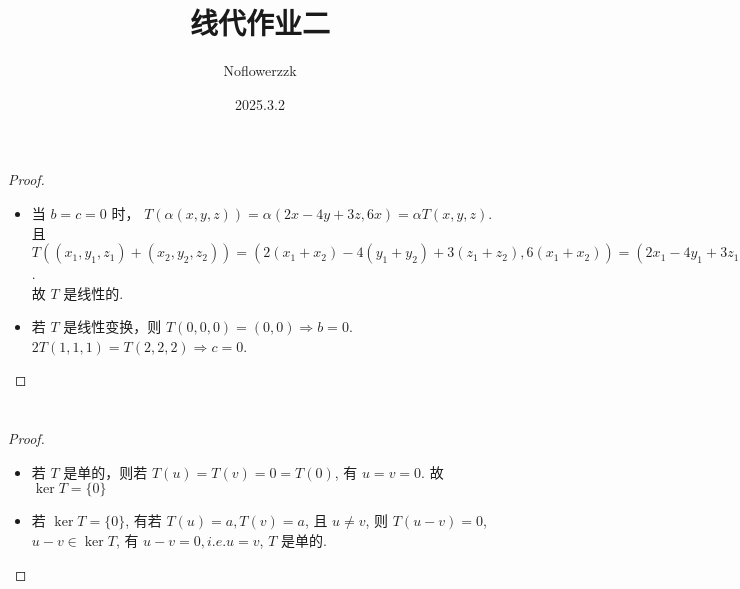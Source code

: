 \documentclass{article}
\title{线代作业二}
\author{Noflowerzzk}
\date{2025.3.2}
\begin{document}
\maketitle

\section{}

\begin{proof}
    \begin{itemize}
        \item 当 $b = c = 0$ 时， $T(\alpha(x, y, z)) = \alpha (2x - 4y + 3z, 6x) = \alpha T(x, y, z)$. \\
        且 $T((x_1, y_1, z_1) + (x_2, y_2, z_2)) = (2(x_1 + x_2) - 4(y_1 + y_2) + 3(z_1 + z_2), 6(x_1 + x_2)) = (2x_1 - 4y_1 + 3z_1, 6x_1) + (2x_2 - 4y_2 + 3z_2, 6x_2) = T(x_1, y_1, z_1) + T(x_2, y_2, z_2)$. \\
        故 $T$ 是线性的.
        \item 若 $T$ 是线性变换，则 $T(0, 0, 0) = (0, 0) \Rightarrow b = 0$. \\
        $2T(1, 1, 1) = T(2, 2, 2) \Rightarrow c = 0$.    
    \end{itemize}
\end{proof}

\section{}

\begin{proof} \quad
    \begin{itemize}
        \item 若 $T$ 是单的，则若 $T(u) = T(v) = 0 = T(0)$, 有 $u = v = 0$. 故 $\ker{T} = \{0\}$
        \item 若 $\ker{T} = \{0\}$, 有若 $T(u) = a, T(v) = a$, 且 $u \neq v$, 则 $T(u - v) = 0$, $u - v \in \ker T$, 有 $u - v = 0, i.e. u = v$, $T$ 是单的.
    \end{itemize}
\end{proof}

\section{}
\end{document}
